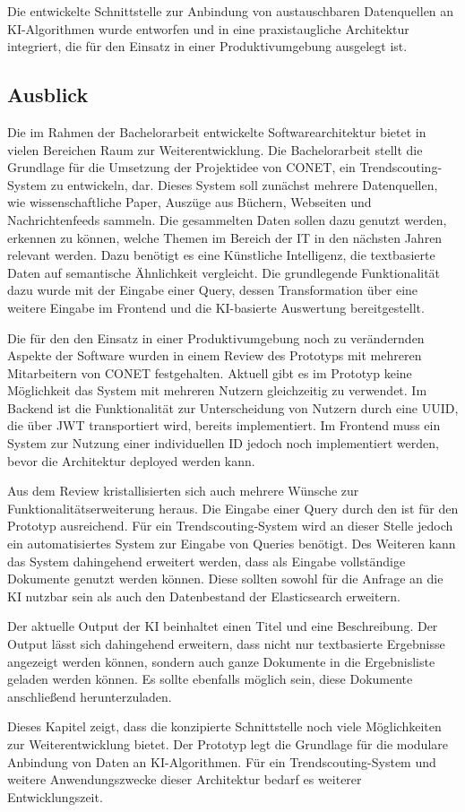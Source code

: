 Die entwickelte Schnittstelle zur Anbindung von austauschbaren Datenquellen an KI-Algorithmen wurde entworfen und in eine praxistaugliche Architektur integriert, die für den Einsatz in einer Produktivumgebung ausgelegt ist. 

\subsection{Ausblick}
Die im Rahmen der Bachelorarbeit entwickelte Softwarearchitektur bietet in vielen Bereichen Raum zur Weiterentwicklung. Die Bachelorarbeit stellt die Grundlage für die Umsetzung der Projektidee von CONET, ein Trendscouting-System zu entwickeln, dar. Dieses System soll zunächst mehrere Datenquellen, wie wissenschaftliche Paper, Auszüge aus Büchern, Webseiten und Nachrichtenfeeds sammeln. Die gesammelten Daten sollen dazu genutzt werden, erkennen zu können, welche Themen im Bereich der IT in den nächsten Jahren relevant werden. Dazu benötigt es eine Künstliche Intelligenz, die textbasierte Daten auf semantische Ähnlichkeit vergleicht. Die grundlegende Funktionalität dazu wurde mit der Eingabe einer Query, dessen Transformation über eine weitere Eingabe im Frontend und die KI-basierte Auswertung bereitgestellt.

Die für den den Einsatz in einer Produktivumgebung noch zu verändernden Aspekte der Software wurden in einem Review des Prototyps mit mehreren Mitarbeitern von CONET festgehalten. Aktuell gibt es im Prototyp keine Möglichkeit das System mit mehreren Nutzern gleichzeitig zu verwendet. Im Backend ist die Funktionalität zur Unterscheidung von Nutzern durch eine UUID, die über JWT transportiert wird, bereits implementiert. Im Frontend muss ein System zur Nutzung einer individuellen ID jedoch noch implementiert werden, bevor die Architektur deployed werden kann.  

Aus dem Review kristallisierten sich auch mehrere Wünsche zur Funktionalitätserweiterung heraus. Die Eingabe einer Query durch den ist für den Prototyp ausreichend. Für ein Trendscouting-System wird an dieser Stelle jedoch ein automatisiertes System zur Eingabe von Queries benötigt. Des Weiteren kann das System dahingehend erweitert werden, dass als Eingabe vollständige Dokumente genutzt werden können. Diese sollten sowohl für die Anfrage an die KI nutzbar sein als auch den Datenbestand der Elasticsearch erweitern. 

Der aktuelle Output der KI beinhaltet einen Titel und eine Beschreibung. Der Output lässt sich dahingehend erweitern, dass nicht nur textbasierte Ergebnisse angezeigt werden können, sondern auch ganze Dokumente in die Ergebnisliste geladen werden können. Es sollte ebenfalls möglich sein, diese Dokumente anschließend herunterzuladen.

Dieses Kapitel zeigt, dass die konzipierte Schnittstelle noch viele Möglichkeiten zur Weiterentwicklung bietet. Der Prototyp legt die Grundlage für die modulare Anbindung von Daten an KI-Algorithmen. Für ein Trendscouting-System und weitere Anwendungszwecke dieser Architektur bedarf es weiterer Entwicklungszeit.
